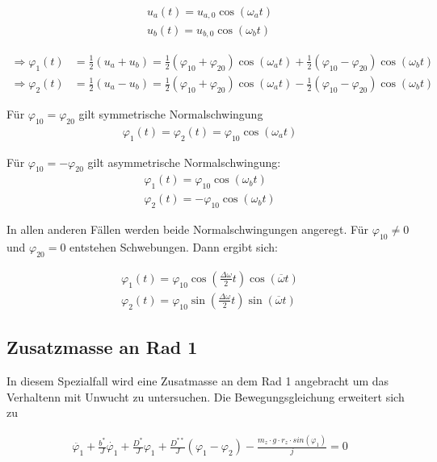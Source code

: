             \begin{align}
                u_a(t) = u_{a,0}\cos(\omega_a t)\label{eq:1.27a}\\
                u_b(t) = u_{b,0}\cos(\omega_b t)\label{eq:1.27b}
            \end{align}

            \begin{align}
                \Rightarrow \varphi_1(t) &= \frac{1}{2}(u_a + u_b) = \frac{1}{2}(\varphi_{10} + \varphi_{20})\cos(\omega_a t) + \frac{1}{2}(\varphi_{10} - \varphi_{20})\cos(\omega_b t)\label{eq:1.28a}\\
                \Rightarrow \varphi_2(t) &= \frac{1}{2}(u_a - u_b) = \frac{1}{2}(\varphi_{10} + \varphi_{20})\cos(\omega_a t) - \frac{1}{2}(\varphi_{10} - \varphi_{20})\cos(\omega_b t)\label{eq:1.28b}
            \end{align}

                Für \(\varphi_{10} = \varphi_{20}\) gilt symmetrische Normalschwingung
                \begin{align}
                    \varphi_1(t) = \varphi_2(t) = \varphi_{10}\cos(\omega_a t)
                \end{align}

                Für \(\varphi_{10} = -\varphi_{20}\) gilt asymmetrische Normalschwingung:
                \begin{align}
                    \varphi_1(t) = \varphi_{10}\cos(\omega_b t)\\
                    \varphi_2(t) = -\varphi_{10}\cos(\omega_b t)
                \end{align}

                In allen anderen Fällen werden beide Normalschwingungen angeregt. Für \(\varphi_{10}\neq 0 \)und \(\varphi_{20} = 0 \) entstehen Schwebungen. Dann ergibt sich:

            \begin{align}
                \varphi_1(t)=\varphi_{10}\cos\left(\frac{\Delta \omega }{2} t\right) \cos( \overline{\omega}t)\label{eq:1.30a}\\
                \varphi_2(t)=\varphi_{10}\sin\left(\frac{\Delta \omega }{2} t\right) \sin( \overline{\omega}t)\label{eq:1.30b}
            \end{align}

        \subsection{Zusatzmasse an Rad 1}
            In diesem Spezialfall wird eine Zusatmasse an dem Rad 1 angebracht um das Verhaltenn mit Unwucht zu untersuchen.
            Die Bewegungsgleichung erweitert sich zu
            
            \begin{align}
                \ddot{\varphi_1}+\frac{b^\ast}{J}\dot{\varphi_1}+\frac{D^\ast}{J}\varphi_1+\frac{D^{\ast\ast}}{J}(\varphi_1-\varphi_2)-\frac{m_z \cdot g \cdot r_z \cdot sin(\varphi_1)}{j}=0 
            \end{align}